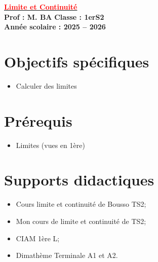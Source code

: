 \documentclass[12pt,a4paper]{article}
\begin{document}
\begin{center}
    \Large\textbf{\underline{\textcolor{red}{Limite et Continuité}}}\\[-0.1cm]
    \normalsize\textbf{Prof : M. BA} \hfill \textbf{Classe : 1erS2}\\[-0.1cm]
    \textbf{Année scolaire : 2025 -- 2026}
\end{center}

\section*{Objectifs spécifiques}
\begin{itemize}[label=$\checkmark$]
    \item Calculer des limites
\end{itemize}

\section*{Prérequis}
\begin{itemize}[label=$\checkmark$]
    \item Limites (vues en 1ère)
\end{itemize}

\section*{Supports didactiques}
\begin{itemize}[label=$\checkmark$]
    \item Cours limite et continuité de Bousso TS2;
    \item Mon cours de limite et continuité de TS2;
    \item CIAM 1ère L;
    \item Dimathème Terminale A1 et A2.
\end{itemize}
\end{document}
